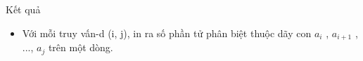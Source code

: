 Kết quả
\begin{itemize}
	\item     Với mỗi truy vấn-d (i, j), in ra số phần tử phân biệt thuộc   dãy con $a_{i}$    , $a_{i+1}$    , ...,   $a_{j}$    trên một dòng.    


\end{itemize}